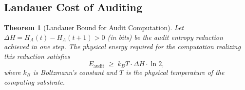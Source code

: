 \documentclass[12pt,a4paper]{article}
\newtheorem{theorem}{Theorem}[section]
\begin{document}
\subsection{Landauer Cost of Auditing}

\begin{theorem}[Landauer Bound for Audit Computation]
\label{thm:landauer}
Let $\Delta H = H_A(t) - H_A(t+1) > 0$ (in bits) be the audit entropy reduction achieved in one step. The physical energy required for the computation realizing this reduction satisfies
\begin{equation}\label{eq:landauer-cost}
    E_{\mathrm{audit}} \;\geq\;
    k_B T \cdot \Delta H \cdot \ln 2,
\end{equation}
where $k_B$ is Boltzmann's constant and $T$ is the physical temperature of the computing substrate.
\end{theorem}
\end{document}
